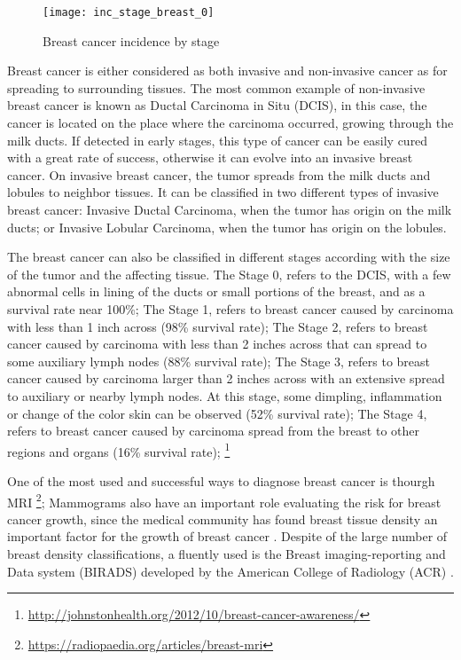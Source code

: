 \begin{figure}[H]
\begin{center}
    \leavevmode
    \texttt{[image: inc\_stage\_breast\_0]}
    \caption[Breast cancer incidence by stage]{Breast cancer incidence by stage \protect\footnotemark}
    \label{fig:breast_cancer_statistics}
  \end{center}
\end{figure}

Breast cancer is either considered as both invasive and non-invasive cancer as for spreading to surrounding tissues. The most common example of non-invasive breast cancer is known as Ductal Carcinoma in Situ (DCIS), in this case, the cancer is located on the place where the carcinoma occurred, growing through the milk ducts. If detected in early stages, this type of cancer can be easily cured with a great rate of success, otherwise it can evolve into an invasive breast cancer. On invasive breast cancer, the tumor spreads from the milk ducts and lobules to neighbor tissues. It can be classified in two different types of invasive breast cancer: Invasive Ductal Carcinoma, when the tumor has origin on the milk ducts; or Invasive Lobular Carcinoma, when the tumor has origin on the lobules.

The breast cancer can also be classified in different stages according with the size of the tumor and the affecting tissue.
The Stage 0, refers to the DCIS, with a few abnormal cells in lining of the ducts or small portions of the breast, and as a survival rate near 100\%;
The Stage 1, refers to breast cancer caused by carcinoma with less than 1 inch across (98\% survival rate); 
The Stage 2, refers to breast cancer caused by carcinoma with less than 2 inches across that can spread to some auxiliary lymph nodes  (88\% survival rate);
The Stage 3, refers to breast cancer caused by carcinoma larger than 2 inches across with an extensive spread to auxiliary or nearby lymph nodes. At this stage, some dimpling, inflammation or change of the color skin can be observed (52\% survival rate);
The Stage 4, refers to breast cancer caused by carcinoma spread from the breast to other regions and organs (16\% survival rate); \footnote{\url{http://johnstonhealth.org/2012/10/breast-cancer-awareness/}}

One of the most used and successful ways to diagnose breast cancer is thourgh MRI \footnote{\url{https://radiopaedia.org/articles/breast-mri}}; Mammograms also have an important role evaluating the risk for breast cancer growth, since the medical community has found breast tissue density an important factor for the growth of breast cancer \cite{Saidin2012}. Despite of the large number of breast density classifications, a fluently used is the Breast imaging-reporting and Data system (BIRADS) developed by the American College of Radiology (ACR) \cite{Saidin2012}.


